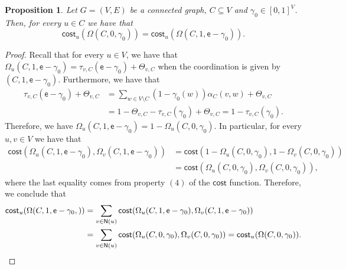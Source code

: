 \documentclass[letterpaper,11pt]{article}
\newcommand{\nsf}{\mathsf{N}}
\newcommand{\cost}{\mathsf{cost}}
\newtheorem{proposition}{Proposition}
\begin{document}
\begin{proposition}
\label{prop:spin}
Let $G=(V,E)$ be a connected graph, $C\subseteq V$ and $\gamma_0\in [0,1]^V$.
Then, for every $u\in C$ we have that 
\begin{equation*}
\cost_u(\Omega(C,0,\gamma_0))=\cost_u(\Omega(C,1,\mathsf{e}-\gamma_0)).
\end{equation*}
\end{proposition}

\begin{proof}
Recall that for every $u\in V$, we have that $\Omega_u(C,1,\mathsf{e}-\gamma_0)=\tau_{v,C}(\mathsf{e}-\gamma_0)+\Theta_{v,C}$ when the coordination is given by $(C,1,\mathsf{e}-\gamma_0)$.
Furthermore, we have that 
\begin{align*}
\tau_{v,C}(\mathsf{e}-\gamma_0)+\Theta_{v,C}&=\sum_{w\in V\setminus C}(1-\gamma_0(w))\alpha_C(v,w) +\Theta_{v,C}\\
&=1-\Theta_{v,C}-\tau_{v,C}(\gamma_0)+\Theta_{v,C}=1-\tau_{v,C}(\gamma_0).
\end{align*}
Therefore, we have $\Omega_u(C,1,\mathsf{e}-\gamma_0)=1-\Omega_u(C,0,\gamma_0)$.
In particular, for every $u,v\in V$ we have that 
\begin{align*}
\cost(\Omega_u(C,1,\mathsf{e}-\gamma_0),\Omega_v(C,1,\mathsf{e}-\gamma_0))&=\cost(1-\Omega_u(C,0,\gamma_0),1-\Omega_v(C,0,\gamma_0))\\
&=\cost(\Omega_u(C,0,\gamma_0),\Omega_v(C,0,\gamma_0)),
\end{align*}
where the last equality comes from property $(4)$ of the $\cost$ function.
Therefore, we conclude that 
\begin{align*}
\cost_u(\Omega(C,1,\mathsf{e}-\gamma_0,))&=\sum_{v\in \nsf(u)}\cost(\Omega_u(C,1,\mathsf{e}-\gamma_0),\Omega_v(C,1,\mathsf{e}-\gamma_0))\\
&=\sum_{v\in \nsf(u)}\cost(\Omega_u(C,0,\gamma_0),\Omega_v(C,0,\gamma_0))=\cost_u(\Omega(C,0,\gamma_0)).\qedhere
\end{align*}
\end{proof}
\end{document}
